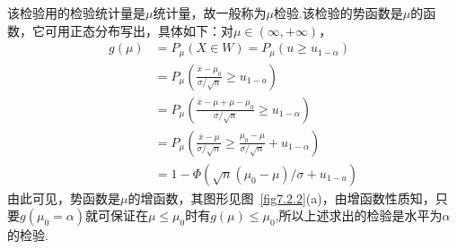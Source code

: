 该检验用的检验统计量是$\mu $统计量，故一般称为$\mu $检验.该检验的势函数是$\mu $的函数，它可用正态分布写出，具体如下：对$\mu \in(\infty,+\infty)$，
\begin{align*}
g ( \mu ) &= P _ { \mu } ( X \in W ) = P _ { \mu } \left( u \geq u _ { 1 - \alpha } \right)\\
&= P _ { \mu } \left( \frac { \overline { x } - \mu _ { 0 } } { \sigma / \sqrt { n } } \geq u _ { 1 - a } \right)\\
&= P _ { \mu } \left( \frac { \overline { x } - \mu + \mu - \mu _ { 0 } } { \sigma / \sqrt { n } } \geq u _ { 1 - \alpha } \right)\\
&= P _ { \mu } \left( \frac { \overline { x } - \mu } { \sigma / \sqrt { n } } \geq \frac { \mu _ { 0 } - \mu } { \sigma / \sqrt { n } } + u _ { 1 - \alpha } \right)\\
&= 1 - \Phi \left( \sqrt { n } \left( \mu _ { 0 } - \mu \right) / \sigma + u _ { 1 - a } \right)
\end{align*}
由此可见，势函数是$\mu $的增函数，其图形见图~\ref{fig7.2.2}(a)，由增函数性质知，只要$g(\mu_{0}=\alpha)$就可保证在$\mu \leq \mu_{ 0 }$时有$g(\mu )\leq \mu_{ 0 }$,所以上述求出的检验是水平为$\alpha$的检验.
